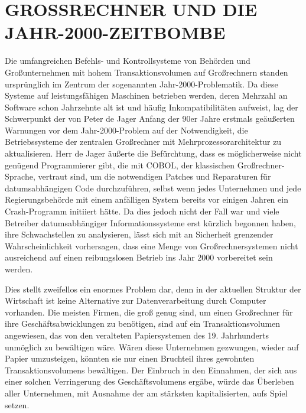 \documentclass[
  a5paper,
  smalldemyvopaper,10pt,twoside,onecolumn,openright,extrafontsizes,hidelinks]{memoir}
\begin{document}
\section{GROSSRECHNER UND DIE
JAHR-2000-ZEITBOMBE}\label{grossrechner-und-die-jahr-2000-zeitbombe}

Die umfangreichen Befehls- und Kontrollsysteme von Behörden und
Großunternehmen mit hohem Transaktionsvolumen auf Großrechnern standen
ursprünglich im Zentrum der sogenannten Jahr-2000-Problematik. Da diese
Systeme auf leistungsfähigen Maschinen betrieben werden, deren Mehrzahl
an Software schon Jahrzehnte alt ist und häufig Inkompatibilitäten
aufweist, lag der Schwerpunkt der von Peter de Jager Anfang der 90er
Jahre erstmals geäußerten Warnungen vor dem Jahr-2000-Problem auf der
Notwendigkeit, die Betriebssysteme der zentralen Großrechner mit
Mehrprozessorarchitektur zu aktualisieren. Herr de Jager äußerte die
Befürchtung, dass es möglicherweise nicht genügend Programmierer gibt,
die mit COBOL, der klassischen Großrechner-Sprache, vertraut sind, um
die notwendigen Patches und Reparaturen für datumsabhängigen Code
durchzuführen, selbst wenn jedes Unternehmen und jede Regierungsbehörde
mit einem anfälligen System bereits vor einigen Jahren ein
Crash-Programm initiiert hätte. Da dies jedoch nicht der Fall war und
viele Betreiber datumsabhängiger Informationssysteme erst kürzlich
begonnen haben, ihre Schwachstellen zu analysieren, lässt sich mit an
Sicherheit grenzender Wahrscheinlichkeit vorhersagen, dass eine Menge
von Großrechnersystemen nicht ausreichend auf einen reibungslosen
Betrieb ins Jahr 2000 vorbereitet sein werden.

Dies stellt zweifellos ein enormes Problem dar, denn in der aktuellen
Struktur der Wirtschaft ist keine Alternative zur Datenverarbeitung
durch Computer vorhanden. Die meisten Firmen, die groß genug sind, um
einen Großrechner für ihre Geschäftsabwicklungen zu benötigen, sind auf
ein Transaktionsvolumen angewiesen, das von den veralteten
Papiersystemen des 19. Jahrhunderts unmöglich zu bewältigen wäre. Wären
diese Unternehmen gezwungen, wieder auf Papier umzusteigen, könnten sie
nur einen Bruchteil ihres gewohnten Transaktionsvolumens bewältigen. Der
Einbruch in den Einnahmen, der sich aus einer solchen Verringerung des
Geschäftsvolumens ergäbe, würde das Überleben aller Unternehmen, mit
Ausnahme der am stärksten kapitalisierten, aufs Spiel setzen.
\end{document}
